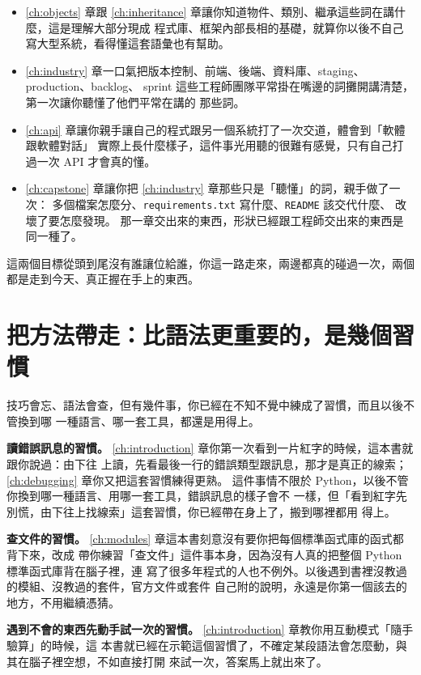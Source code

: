 \begin{itemize}
    \item \ref{ch:objects} 章跟 \ref{ch:inheritance} 章讓你知道物件、類別、繼承這些詞在講什麼，這是理解大部分現成
    程式庫、框架內部長相的基礎，就算你以後不自己寫大型系統，看得懂這套語彙也有幫助。
    \item \ref{ch:industry} 章一口氣把版本控制、前端、後端、資料庫、staging、production、backlog、
    sprint 這些工程師團隊平常掛在嘴邊的詞攤開講清楚，第一次讓你聽懂了他們平常在講的
    那些詞。
    \item \ref{ch:api} 章讓你親手讓自己的程式跟另一個系統打了一次交道，體會到「軟體跟軟體對話」
    實際上長什麼樣子，這件事光用聽的很難有感覺，只有自己打過一次 API 才會真的懂。
    \item \ref{ch:capstone} 章讓你把 \ref{ch:industry} 章那些只是「聽懂」的詞，親手做了一次：
    多個檔案怎麼分、\texttt{requirements.txt} 寫什麼、\texttt{README} 該交代什麼、
    改壞了要怎麼發現。 那一章交出來的東西，形狀已經跟工程師交出來的東西是同一種了。
\end{itemize}

這兩個目標從頭到尾沒有誰讓位給誰，你這一路走來，兩邊都真的碰過一次，兩個
都是走到今天、真正握在手上的東西。

\section{把方法帶走：比語法更重要的，是幾個習慣}
\label{sec:habits-to-keep}

技巧會忘、語法會查，但有幾件事，你已經在不知不覺中練成了習慣，而且以後不管換到哪
一種語言、哪一套工具，都還是用得上。

\textbf{讀錯誤訊息的習慣。} \ref{ch:introduction} 章你第一次看到一片紅字的時候，這本書就跟你說過：由下往
上讀，先看最後一行的錯誤類型跟訊息，那才是真正的線索；\ref{ch:debugging} 章你又把這套習慣練得更熟。
這件事情不限於 Python，以後不管你換到哪一種語言、用哪一套工具，錯誤訊息的樣子會不
一樣，但「看到紅字先別慌，由下往上找線索」這套習慣，你已經帶在身上了，搬到哪裡都用
得上。

\textbf{查文件的習慣。} \ref{ch:modules} 章這本書刻意沒有要你把每個標準函式庫的函式都背下來，改成
帶你練習「查文件」這件事本身，因為沒有人真的把整個 Python 標準函式庫背在腦子裡，連
寫了很多年程式的人也不例外。以後遇到書裡沒教過的模組、沒教過的套件，官方文件或套件
自己附的說明，永遠是你第一個該去的地方，不用繼續憑猜。

\textbf{遇到不會的東西先動手試一次的習慣。} \ref{ch:introduction} 章教你用互動模式「隨手驗算」的時候，這
本書就已經在示範這個習慣了，不確定某段語法會怎麼動，與其在腦子裡空想，不如直接打開
來試一次，答案馬上就出來了。


